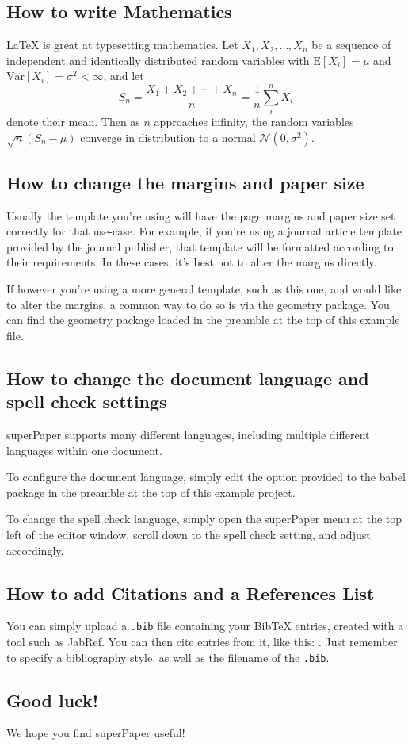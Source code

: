 \documentclass{article}
\begin{document}
\subsection{How to write Mathematics}

\LaTeX{} is great at typesetting mathematics. Let $X_1, X_2, \ldots, X_n$ be a sequence of independent and identically distributed random variables with $\text{E}[X_i] = \mu$ and $\text{Var}[X_i] = \sigma^2 < \infty$, and let
\[S_n = \frac{X_1 + X_2 + \cdots + X_n}{n}
      = \frac{1}{n}\sum_{i}^{n} X_i\]
denote their mean. Then as $n$ approaches infinity, the random variables $\sqrt{n}(S_n - \mu)$ converge in distribution to a normal $\mathcal{N}(0, \sigma^2)$.


\subsection{How to change the margins and paper size}

Usually the template you're using will have the page margins and paper size set correctly for that use-case. For example, if you're using a journal article template provided by the journal publisher, that template will be formatted according to their requirements. In these cases, it's best not to alter the margins directly.

If however you're using a more general template, such as this one, and would like to alter the margins, a common way to do so is via the geometry package. You can find the geometry package loaded in the preamble at the top of this example file.

\subsection{How to change the document language and spell check settings}

superPaper supports many different languages, including multiple different languages within one document.

To configure the document language, simply edit the option provided to the babel package in the preamble at the top of this example project.

To change the spell check language, simply open the superPaper menu at the top left of the editor window, scroll down to the spell check setting, and adjust accordingly.

\subsection{How to add Citations and a References List}

You can simply upload a \verb|.bib| file containing your BibTeX entries, created with a tool such as JabRef. You can then cite entries from it, like this: \cite{greenwade93}. Just remember to specify a bibliography style, as well as the filename of the \verb|.bib|.

\subsection{Good luck!}

We hope you find superPaper useful!



\end{document}
